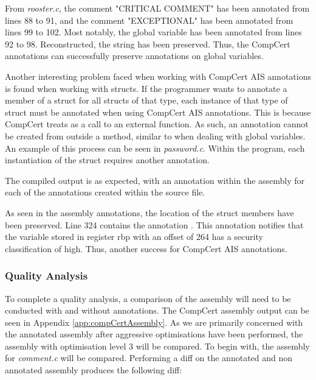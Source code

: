 

From \textit{rooster.c}, the comment "CRITICAL COMMENT" has been annotated from lines 88 to 91, and the comment "EXCEPTIONAL" has been annotated from lines 99 to 102. Most notably, the global variable  has been annotated from lines 92 to 98. Reconstructed, the string  has been preserved. Thus, the CompCert annotations can successfully preserve annotations on global variables.


Another interesting problem faced when working with CompCert AIS annotations is found when working with structs. If the programmer wants to annotate a member of a struct for all structs of that type, each instance of that type of struct must be annotated when using CompCert AIS annotations. This is because CompCert treats  as a call to an external function. As such, an annotation cannot be created from outside a method, similar to when dealing with global variables. An example of this process can be seen in \textit{password.c}. Within the program, each instantiation of the struct  requires another annotation. 



The compiled output is as expected, with an annotation within the assembly for each of the annotations created within the source file.



As seen in the assembly annotations, the location of the struct members have been preserved. Line 324 contains the annotation . This annotation notifies that the variable stored in register rbp with an offset of 264 has a security classification of high. Thus, another success for CompCert AIS annotations.

\subsubsection{Quality Analysis}
To complete a quality analysis, a comparison of the assembly will need to be conducted with and without annotations. The CompCert assembly output can be seen in Appendix \ref{app:compCertAssembly}. As we are primarily concerned with the annotated assembly after aggressive optimisations have been performed, the assembly with optimisation level 3 will be compared. To begin with, the assembly for \textit{comment.c} will be compared. Performing a diff on the annotated and non annotated assembly produces the following diff:

